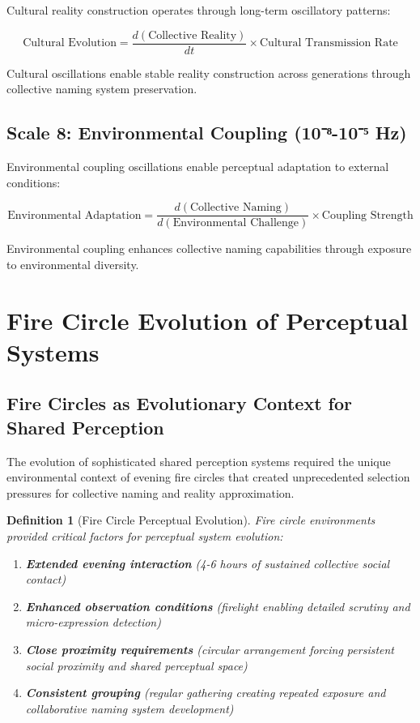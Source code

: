 \documentclass[12pt,a4paper]{article}
\newtheorem{definition}{Definition}
\begin{document}
Cultural reality construction operates through long-term oscillatory patterns:

\begin{equation}
\text{Cultural Evolution} = \frac{d(\text{Collective Reality})}{dt} \times \text{Cultural Transmission Rate}
\end{equation}

Cultural oscillations enable stable reality construction across generations through collective naming system preservation.

\subsection{Scale 8: Environmental Coupling (10⁻⁸-10⁻⁵ Hz)}

Environmental coupling oscillations enable perceptual adaptation to external conditions:

\begin{equation}
\text{Environmental Adaptation} = \frac{d(\text{Collective Naming})}{d(\text{Environmental Challenge})} \times \text{Coupling Strength}
\end{equation}

Environmental coupling enhances collective naming capabilities through exposure to environmental diversity.

\section{Fire Circle Evolution of Perceptual Systems}

\subsection{Fire Circles as Evolutionary Context for Shared Perception}

The evolution of sophisticated shared perception systems required the unique environmental context of evening fire circles that created unprecedented selection pressures for collective naming and reality approximation.

\begin{definition}[Fire Circle Perceptual Evolution]
Fire circle environments provided critical factors for perceptual system evolution:
\begin{enumerate}
\item \textbf{Extended evening interaction} (4-6 hours of sustained collective social contact)
\item \textbf{Enhanced observation conditions} (firelight enabling detailed scrutiny and micro-expression detection)
\item \textbf{Close proximity requirements} (circular arrangement forcing persistent social proximity and shared perceptual space)
\item \textbf{Consistent grouping} (regular gathering creating repeated exposure and collaborative naming system development)
\end{enumerate}
\end{definition}
\end{document}
